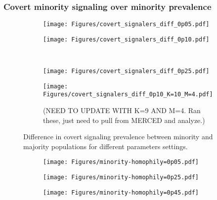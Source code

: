 \documentclass[11pt,letterpaper]{article}
\begin{document}
\subsubsection{Covert minority signaling over minority prevalence}


\begin{figure}[H]
  \centering
  \begin{subfigure}{0.48\textwidth}
    \centering
    \texttt{[image: Figures/covert\_signalers\_diff\_0p05.pdf]}
  \end{subfigure}
  \hfill
  \begin{subfigure}{0.48\textwidth}
    \centering
    \texttt{[image: Figures/covert\_signalers\_diff\_0p10.pdf]}
  \end{subfigure} \\[.25in]
  \begin{subfigure}{0.48\textwidth}
    \centering
    \texttt{[image: Figures/covert\_signalers\_diff\_0p25.pdf]}
  \end{subfigure}
  \hfill
  \begin{subfigure}{0.48\textwidth}
    \centering
    \texttt{[image: Figures/covert\_signalers\_diff\_0p10\_K=10\_M=4.pdf]}
    \caption{(NEED TO UPDATE WITH K=9 AND M=4. Ran these, just need to pull from
    MERCED and analyze.)}
  \end{subfigure}
  \caption{Difference in covert signaling prevalence between minority and
  majority populations for different parameters settings.}
  \label{fig:covert-signaling-minority-heatmap}
\end{figure}

\begin{figure}[H]
  \centering
  \begin{subfigure}{0.31\textwidth}
    \texttt{[image: Figures/minority-homophily=0p05.pdf]}
    \caption{}
  \end{subfigure}
  \begin{subfigure}{0.31\textwidth}
    \texttt{[image: Figures/minority-homophily=0p25.pdf]}
    \caption{}
  \end{subfigure}
  \begin{subfigure}{0.31\textwidth}
    \texttt{[image: Figures/minority-homophily=0p45.pdf]}
    \caption{}
  \end{subfigure}
  \caption{}
\end{figure}
\end{document}
